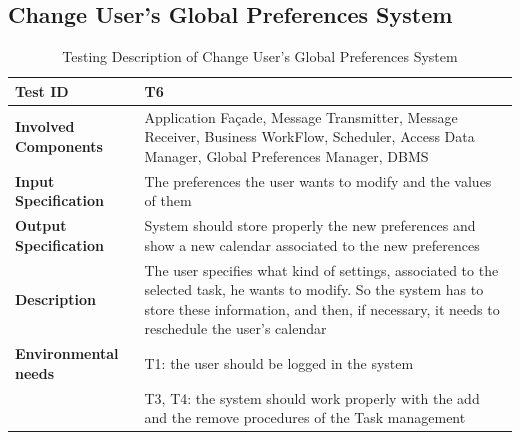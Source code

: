 \subsection*{Change User's Global Preferences System}

\begin{table}[H]
    \centering
    \begin{tabular}{p{4.55cm} p{7cm}}
        
        \hline
        
        \textbf{Test ID}                & T6 \\
        
        \hline
        
        \textbf{Involved Components}    & Application Façade, Message Transmitter, Message Receiver, Business                                          WorkFlow, Scheduler, Access Data Manager, Global Preferences Manager,                                      DBMS\\
        
        \hline
        
        \textbf{Input Specification}    & The preferences the user wants to modify and the values of them\\
        
        \hline
        
        \textbf{Output Specification}   & System should store properly the new preferences and show a new calendar associated to the new preferences\\
        
        \hline
        
        
        \textbf{Description}            & The user specifies what kind of settings, associated to the selected task, he wants to modify. So the system has to store these information, and then, if necessary, it needs to reschedule the user's calendar\\
        \hline
        
        \textbf{Environmental needs}    & T1: the user should be logged in the system\\
                                        & T3, T4: the system should work properly with the add and the remove procedures of the Task management \\
        
        \hline
        
    \end{tabular}
    \caption{Testing Description of Change User's Global Preferences System}
    
\end{table}




